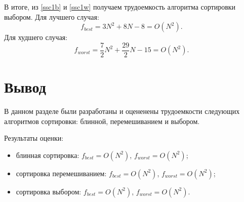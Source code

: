 В итоге, из \eqref{ssc1b} и \eqref{ssc1w} получаем трудоемкость алгоритма сортировки выбором. Для лучшего случая:
\begin{equation}\label{ssb}
	f_{best} = 3N^2 + 8N - 8 = O(N^2).
\end{equation}
Для худшего случая:
\begin{equation}\label{ssw}
	f_{worst} = \frac{7}{2}N^2 + \frac{29}{2}N - 15 = O(N^2).
\end{equation}

\section*{Вывод}

В данном разделе были разработаны и оцененены трудоемкости следующих алгоритмов сортировки: блинной, перемешиванием и выбором.

Результаты оценки:
\begin{itemize}
	\item блинная сортировка: $f_{best} = O(N^2)$, $f_{worst} = O(N^2)$;
	\item сортировка перемешиванием: $f_{best} = O(N^2)$, $f_{worst} = O(N^2)$;
	\item сортировка выбором: $f_{best} = O(N^2)$, $f_{worst} = O(N^2)$.
\end{itemize}

\clearpage
